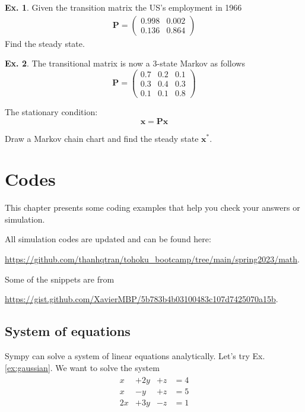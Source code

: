 \documentclass[10pt,a4paper]{book}
\theoremstyle{definition}\newtheorem{definition}{Definition}
\theoremstyle{definition}\newtheorem{fact}{Fact}
\theoremstyle{definition}\newtheorem{ex}{Ex.}
\theoremstyle{definition}\newtheorem{project}{Project}
\theoremstyle{definition}\newtheorem{problem}{Problem}
\theoremstyle{definition}\newtheorem{example}{Example}
\numberwithin{theorem}{chapter}
\numberwithin{corollary}{chapter}
\numberwithin{assumption}{chapter}
\numberwithin{definition}{chapter}
\numberwithin{prop}{chapter}
\numberwithin{notation}{chapter}
\numberwithin{problem}{chapter}
\numberwithin{example}{chapter}
\numberwithin{fact}{chapter}
\numberwithin{ex}{chapter}
\def\P{\mathbb P}
\def\P{\mathbf P}
\def\x{\mathbf x}
\begin{document}
	\begin{ex}
		Given the transition matrix the US's employment in 1966 
		\begin{align*}
			\P = \begin{pmatrix}
				0.998 & 0.002 \\ 0.136 & 0.864
			\end{pmatrix}
		\end{align*}
		Find the steady state.
	\end{ex}
	
	\begin{ex}
		The transitional matrix is now a 3-state Markov as follows
		$$ \P = \begin{pmatrix} 0.7 & 0.2 & 0.1 \\ 0.3 & 0.4 & 0.3 \\ 0.1 & 0.1 & 0.8  \end{pmatrix} $$ 
		
		The stationary condition: $$ \x =\P\x $$ 
		
		Draw a Markov chain chart and find the steady state $\x^*$.
	\end{ex}
	
		\chapter{Codes} \label{sec:code}
	This chapter presents some coding examples that help you check your answers or simulation. 
	
	All simulation codes are updated and can be found here:
	
	\href{https://github.com/thanhqtran/tohoku_bootcamp/tree/main/spring2023/math}{https://github.com/thanhqtran/tohoku\_bootcamp/tree/main/spring2023/math}. 
	
	Some of the snippets are from 
	
	\href{https://gist.github.com/XavierMBP/5b783b4b03100483c107d7425070a15b}{https://gist.github.com/XavierMBP/5b783b4b03100483c107d7425070a15b}.
	
	\section{System of equations}
	Sympy can solve a system of linear equations analytically. Let's try Ex.\ref{ex:gaussian}. We want to solve the system
	\begin{align*}
		\begin{matrix}
			x  & + 2y & +z & = 4 \\
			x  & - y  & +z & =5  \\
			2x & +3y  & -z & =1  
		\end{matrix}
	\end{align*}
	
\end{document}
